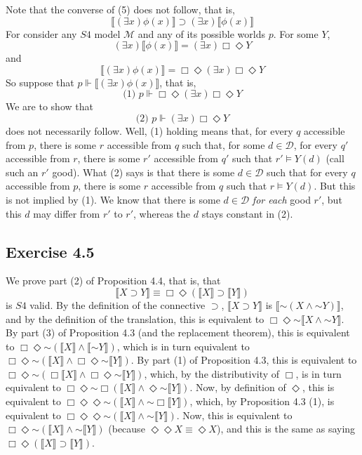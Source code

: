 \documentclass{article}
\newcommand*{\oldneg}{\mathord{\sim}}
\theoremstyle{definition}
\begin{document}
Note that the converse of (5) does not follow, that is,
\[ \llbracket(\exists x)\phi(x)\rrbracket\supset(\exists x)\llbracket\phi(x)\rrbracket \] 
For consider any $S4$ model $\mathcal{M}$ and any of its possible worlds $p$.
For some $Y$,
\[ (\exists x)\llbracket\phi(x)\rrbracket=(\exists x)\Box\Diamond Y \]
and
\[ \llbracket(\exists x)\phi(x)\rrbracket=\Box\Diamond(\exists x)\Box\Diamond Y \]
So suppose that
$p\Vdash \llbracket(\exists x)\phi(x)\rrbracket$, that is,
\[ \textrm{(1) }p\Vdash\Box\Diamond(\exists x)\Box\Diamond Y \] We are to show that
\[ \textrm{(2) }p\Vdash(\exists x)\Box\Diamond Y \] does not necessarily follow. Well,
(1) holding means that, for every $q$ accessible from $p$, there is some 
$r$ accessible from $q$ such that, for some $d\in\mathcal{D}$, for every 
$q'$ accessible from $r$, there is some $r'$ accessible from $q'$ such that 
$r'\vDash Y(d)$ (call such an $r'$ good). What (2) says is that there is some $d\in\mathcal{D}$ such that 
for every $q$ accessible from $p$, there is some $r$ accessible from $q$ such that $r\vDash Y(d)$. But this is not 
implied by (1). We know that there is some $d\in\mathcal{D}$ \textit{for each} good $r'$, but this $d$ may differ from 
$r'$ to $r'$, whereas the $d$ stays constant in (2). 
 
\subsection*{Exercise 4.5}
We prove part (2) of Proposition 4.4, that is, that
\[ \llbracket X\supset Y\rrbracket\equiv\Box\Diamond(\llbracket X\rrbracket\supset\llbracket Y\rrbracket) \]
is $S4$ valid. By the definition of the connective $\supset$, $\llbracket X\supset Y\rrbracket$ is 
$\llbracket \oldneg(X\wedge \oldneg Y)\rrbracket$, and by the definition of the translation, this is equivalent to
$\Box\Diamond\oldneg\llbracket X\wedge\oldneg Y\rrbracket$. By part (3) of Proposition 4.3 (and the replacement theorem), 
this is equivalent to $\Box\Diamond\oldneg(\llbracket X\rrbracket\wedge\llbracket\oldneg Y\rrbracket)$, which is in turn 
equivalent to $\Box\Diamond\oldneg(\llbracket X\rrbracket\wedge\Box\Diamond\oldneg\llbracket Y\rrbracket)$. By 
part (1) of Proposition 4.3, this is equivalent to
$\Box\Diamond\oldneg(\Box\llbracket X\rrbracket\wedge\Box\Diamond\oldneg\llbracket Y\rrbracket)$, which, by the 
distributivity of $\Box$, is in turn equivalent to 
$\Box\Diamond\oldneg\Box(\llbracket X\rrbracket\wedge\Diamond\oldneg\llbracket Y\rrbracket)$. Now, by definition of 
$\Diamond$, this is equivalent to
$\Box\Diamond\Diamond\oldneg(\llbracket X\rrbracket\wedge\oldneg\Box\llbracket Y\rrbracket)$, which, by Proposition 
4.3 (1), is equivalent to
$\Box\Diamond\Diamond\oldneg(\llbracket X\rrbracket\wedge\oldneg\llbracket Y\rrbracket)$. Now, this is equivalent to
$\Box\Diamond\oldneg(\llbracket X\rrbracket\wedge\oldneg\llbracket Y\rrbracket)$ (because 
$\Diamond\Diamond X\equiv\Diamond X$), and this is the same as saying
$\Box\Diamond(\llbracket X\rrbracket\supset\llbracket Y\rrbracket)$. 
\end{document}
